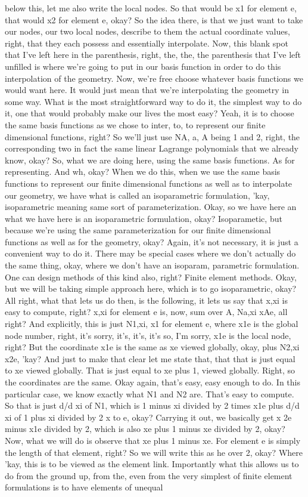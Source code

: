 \documentclass[10pt]{article}
\begin{document}
below this, let me also write the local nodes. So that would be x1 for element e, that would x2 for element e, okay? So the idea there, is that we just want to take our nodes, our two local nodes, describe to them the actual coordinate values, right, that they each possess and essentially interpolate. Now, this blank spot that I've left here in the parenthesis, right, the, the, the parenthesis that I've left unfilled is where we're going to put in our basis function in order to do this interpolation of the geometry. Now, we're free choose whatever basis functions we would want here. It would just mean that we're interpolating the geometry in some way. What is the most straightforward way to do it, the simplest way to do it, one that would probably make our lives the most easy? Yeah, it is to choose the same basis functions as we chose to inter, to, to represent our finite dimensional functions, right? So we'll just use NA, a, A being 1 and 2, right, the corresponding two in fact the same linear Lagrange polynomials that we already know, okay? So, what we are doing here, using the same basis functions. As for representing. And wh, okay? When we do this, when we use the same basis functions to represent our finite dimensional functions as well as to interpolate our geometry, we have what is called an isoparametric formulation, 'kay, isoparametric meaning same sort of parameterization. Okay, so we have here an what we have here is an isoparametric formulation, okay? Isoparametic, but because we're using the same parameterization for our finite dimensional functions as well as for the geometry, okay? Again, it's not necessary, it is just a convenient way to do it. There may be special cases where we don't actually do the same thing, okay, where we don't have an isoparam, parametric formulation. One can design methods of this kind also, right? Finite element methods. Okay, but we will be taking simple approach here, which is to go isoparametric, okay? All right, what that lets us do then, is the following, it lets us say that x,xi is easy to compute, right? x,xi for element e is, now, sum over A, Na,xi xAe, all right? And explicitly, this is just N1,xi, x1 for element e, where x1e is the global node number, right, it's sorry, it's, it's, it's so, I'm sorry, x1e is the local node, right? But the coordinate x1e is the same as xe viewed globally, okay, plus N2,xi x2e, 'kay? And just to make that clear let me state that, that that is just equal to xe viewed globally. That is just equal to xe plus 1, viewed globally. Right, so the coordinates are the same. Okay again, that's easy, easy enough to do. In this particular case, we know exactly what N1 and N2 are. That's easy to compute. So that is just d/d xi of N1, which is 1 minus xi divided by 2 times x1e plus d/d xi of 1 plus xi divided by 2 x to e, okay? Carrying it out, we basically get x 2e minus x1e divided by 2, which is also xe plus 1 minus xe divided by 2, okay? Now, what we will do is observe that xe plus 1 minus xe. For element e is simply the length of that element, right? So we will write this as he over 2, okay? Where 'kay, this is to be viewed as the element link. Importantly what this allows us to do from the ground up, from the, even from the very simplest of finite element formulations is to have elements of unequal 
\end{document}
